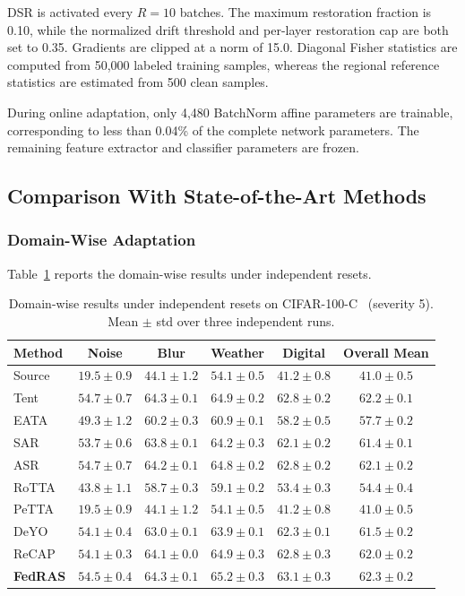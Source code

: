 \documentclass[journal]{IEEEtran}
\begin{document}
DSR is activated every $R = 10$ batches. The maximum restoration fraction is 0.10, while the normalized drift threshold and per-layer restoration cap are both set to 0.35. Gradients are clipped at a norm of 15.0. Diagonal Fisher statistics are computed from 50,000 labeled training samples, whereas the regional reference statistics are estimated from 500 clean samples.

During online adaptation, only 4,480 BatchNorm affine parameters are trainable, corresponding to less than 0.04\% of the complete network parameters. The remaining feature extractor and classifier parameters are frozen.

\subsection{Comparison With State-of-the-Art Methods}

\subsubsection{Domain-Wise Adaptation}
Table~\ref{tab:domain_wise} reports the domain-wise results under independent resets.

\begin{table}[t]
\centering
\caption{Domain-wise results under independent resets on CIFAR-100-C~\cite{3} (severity 5). Mean $\pm$ std over three independent runs.}
\label{tab:domain_wise}
\begin{tabular}{lccccc}
\toprule
\textbf{Method} & \textbf{Noise} & \textbf{Blur} & \textbf{Weather} & \textbf{Digital} & \textbf{Overall Mean} \\
\midrule
Source & $19.5 \pm 0.9$ & $44.1 \pm 1.2$ & $54.1 \pm 0.5$ & $41.2 \pm 0.8$ & $41.0 \pm 0.5$ \\
Tent   & $\mathbf{54.7 \pm 0.7}$ & $\mathbf{64.3 \pm 0.1}$ & $64.9 \pm 0.2$ & $62.8 \pm 0.2$ & $62.2 \pm 0.1$ \\
EATA   & $49.3 \pm 1.2$ & $60.2 \pm 0.3$ & $60.9 \pm 0.1$ & $58.2 \pm 0.5$ & $57.7 \pm 0.2$ \\
SAR    & $53.7 \pm 0.6$ & $63.8 \pm 0.1$ & $64.2 \pm 0.3$ & $62.1 \pm 0.2$ & $61.4 \pm 0.1$ \\
ASR    & $\mathbf{54.7 \pm 0.7}$ & $64.2 \pm 0.1$ & $64.8 \pm 0.2$ & $62.8 \pm 0.2$ & $62.1 \pm 0.2$ \\
RoTTA  & $43.8 \pm 1.1$ & $58.7 \pm 0.3$ & $59.1 \pm 0.2$ & $53.4 \pm 0.3$ & $54.4 \pm 0.4$ \\
PeTTA  & $19.5 \pm 0.9$ & $44.1 \pm 1.2$ & $54.1 \pm 0.5$ & $41.2 \pm 0.8$ & $41.0 \pm 0.5$ \\
DeYO   & $54.1 \pm 0.4$ & $63.0 \pm 0.1$ & $63.9 \pm 0.1$ & $62.3 \pm 0.1$ & $61.5 \pm 0.2$ \\
ReCAP  & $54.1 \pm 0.3$ & $64.1 \pm 0.0$ & $64.9 \pm 0.3$ & $62.8 \pm 0.3$ & $62.0 \pm 0.2$ \\
\textbf{FedRAS} & $54.5 \pm 0.4$ & $\mathbf{64.3 \pm 0.1}$ & $\mathbf{65.2 \pm 0.3}$ & $\mathbf{63.1 \pm 0.3}$ & $\mathbf{62.3 \pm 0.2}$ \\
\bottomrule
\end{tabular}
\end{table}
\end{document}
